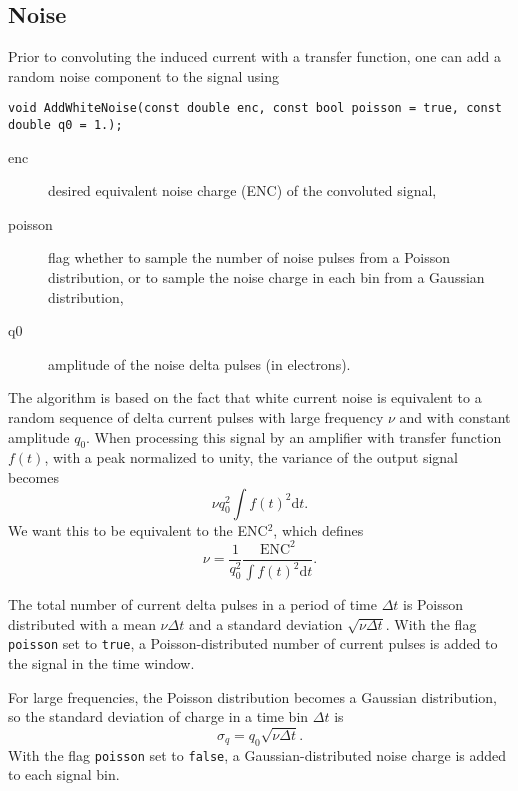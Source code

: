 \subsection{Noise}
Prior to convoluting the induced current with a transfer function, 
one can add a random noise component to the signal using 
\begin{lstlisting}
void AddWhiteNoise(const double enc, const bool poisson = true, const double q0 = 1.);
\end{lstlisting}
\begin{description}
  \item[enc] desired equivalent noise charge (ENC) of the convoluted signal,
  \item[poisson] flag whether to sample the number of noise pulses 
    from a Poisson distribution, or to sample the noise charge in each 
    bin from a Gaussian distribution,
  \item[q0] amplitude of the noise delta pulses (in electrons). 
\end{description} 

The algorithm is based on the fact that white current noise is equivalent 
to a random sequence of delta current pulses with large frequency $\nu$ 
and with constant amplitude $q_0$. When processing this signal by an 
amplifier with transfer function $f\left(t\right)$, 
with a peak normalized to unity, the variance of the output signal becomes
\begin{equation*}
  \nu q_{0}^{2} \int f\left(t\right)^{2} \text{d}t.
\end{equation*}
We want this to be equivalent to the ENC$^2$, 
which defines 
\begin{equation*}
\nu = \frac{1}{q_{0}^{2}}\frac{\text{ENC}^2}{\int f\left(t\right)^2 \text{d}t}.
\end{equation*}

The total number of current delta pulses in a period of time $\Delta{t}$ 
is Poisson distributed with a mean $\nu\Delta{t}$ 
and a standard deviation $\sqrt{\nu\Delta{t}}$.
With the flag \texttt{poisson} set to \texttt{true}, a Poisson-distributed 
number of current pulses is added to the signal in the time window.

For large frequencies, the Poisson distribution becomes a 
Gaussian distribution, so the standard deviation of charge 
in a time bin $\Delta{t}$ is 
\begin{equation*}
  \sigma_{q} = q_{0} \sqrt{\nu\Delta{t}}.
\end{equation*}
With the flag \texttt{poisson} set to \texttt{false}, 
a Gaussian-distributed noise charge is added to each signal bin. 
